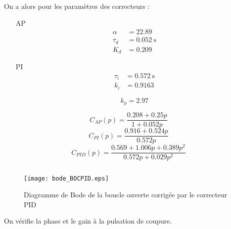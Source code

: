 On a alors pour les paramètres des correcteurs :
\begin{itemize}
    \item[AP] 
        \begin{align*}
            \alpha&=22.89\\
            \tau_d&=\SI{0.052}{\second}\\
            K_d&=0.209
        \end{align*}
    \item[PI]
        \begin{align*}
            \tau_i&=\SI{0.572}{\second}\\
            k_i&=0.9163
        \end{align*}

\[
    k_p=2.97
\]
\end{itemize}
\[
    C_{AP}(p)=\dfrac{0.208 + 0.25p}{1+0.052p}
\]
\[
    C_{PI}(p)=\dfrac{0.916 + 0.524p}{0.572p}
\]
\[
    C_{PID}(p)=\dfrac{0.569+1.006p+0.389p^2}{0.572p+ 0.029p^2}  
\]
\inputminted{scilab}{codes/scilab/code_q16_chap_correction.sce}
\begin{figure}
    \centering
    \texttt{[image: bode\_BOCPID.eps]}
    \caption{Diagramme de Bode de la boucle ouverte corrigée par 
    le correcteur PID}
\end{figure}
On vérifie la phase et le gain à la pulsation de coupure.

